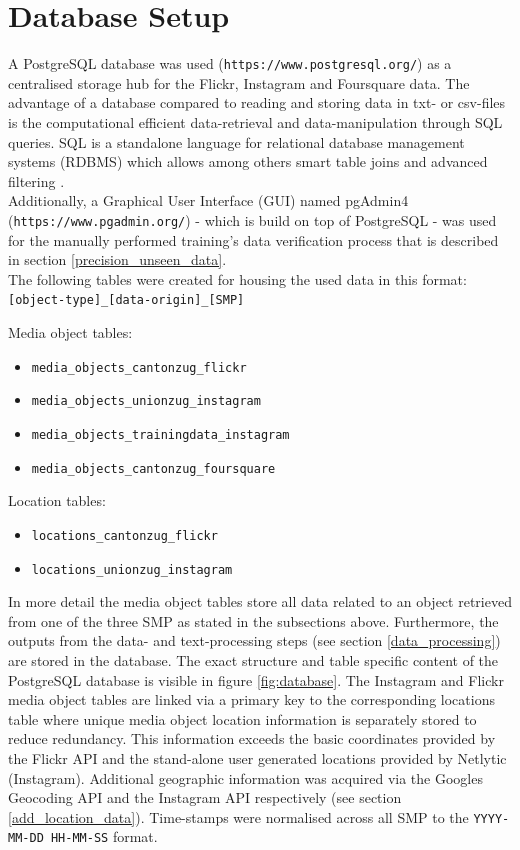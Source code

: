 \section{Database Setup} \label{database_setup}
A PostgreSQL database was used (\texttt{https://www.postgresql.org/}) as a centralised storage hub for the Flickr, Instagram and Foursquare data. The advantage of a database compared to reading and storing data in txt- or csv-files is the computational efficient data-retrieval and data-manipulation through SQL queries. SQL is a standalone language for relational database management systems (RDBMS) which allows among others smart table joins and advanced filtering \parencite{PostgreSQL2019}.\\
Additionally, a Graphical User Interface (GUI) named pgAdmin4 (\texttt{https://www.pgadmin.org/}) - which is build on top of PostgreSQL - was used for the manually performed training's data verification process that is described in section \ref{precision_unseen_data}.\\
The following tables were created for housing the used data in this format:\\ \texttt{[object-type]\_[data-origin]\_[SMP]} \\
\newline

Media object tables:
\begin{itemize}
    \item \texttt{media\_objects\_cantonzug\_flickr}
    \item \texttt{media\_objects\_unionzug\_instagram}
    \item \texttt{media\_objects\_trainingdata\_instagram}
    \item \texttt{media\_objects\_cantonzug\_foursquare}
\end{itemize}
\newline
Location tables:
\begin{itemize}
    \item \texttt{locations\_cantonzug\_flickr}
    \item \texttt{locations\_unionzug\_instagram}
\end{itemize}
\newline
In more detail the media object tables store all data related to an object retrieved from one of the three SMP as stated in the subsections above. Furthermore, the outputs from the data- and text-processing steps (see section \ref{data_processing}) are stored in the database. The exact structure and table specific content of the PostgreSQL database is visible in figure \ref{fig:database}. The Instagram and Flickr media object tables are linked via a primary key to the corresponding locations table where unique media object location information is separately stored to reduce redundancy. This information exceeds the basic coordinates provided by the Flickr API and the stand-alone user generated locations provided by Netlytic (Instagram). Additional geographic information was acquired via the Googles Geocoding API and the Instagram API respectively (see section \ref{add_location_data}). Time-stamps were normalised across all SMP to the \texttt{YYYY-MM-DD HH-MM-SS} format.

